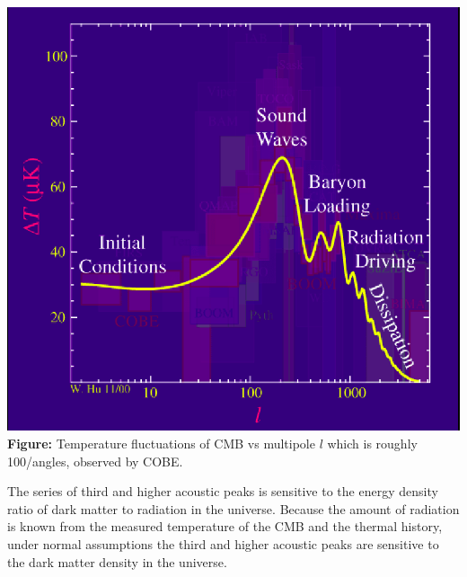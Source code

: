 \documentclass[12pt]{report}
\begin{document}
\begin{center}
\includegraphics[scale=0.35]{deltvsl.png}\\
\textbf{Figure:} Temperature fluctuations of CMB vs multipole $l$ which is roughly 100/angles, observed by COBE.\cite{whu}
\end{center}


 The series of third and higher acoustic peaks is sensitive to the energy density ratio of dark matter to radiation in the universe.  Because the amount of radiation is known from the measured temperature of the CMB and the thermal history, under normal assumptions the third and higher acoustic peaks are sensitive to the dark matter density in the universe.
  
\end{document}
